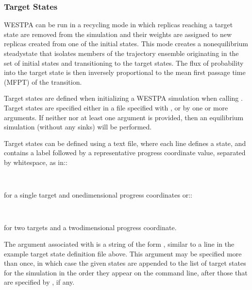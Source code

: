 \documentclass[letterpaper,10pt,english]{sphinxmanual}
\begin{document}
\subsubsection{Target States}
\label{\detokenize{users_guide/west/setup:target-states}}
WESTPA can be run in a recycling mode in which replicas reaching a target state
are removed from the simulation and their weights are assigned to new replicas
created from one of the initial states. This mode creates a non\sphinxhyphen{}equilibrium
steady\sphinxhyphen{}state that isolates members of the trajectory ensemble originating in
the set of initial states and transitioning to the target states. The flux of
probability into the target state is then inversely proportional to the mean
first passage time (MFPT) of the transition.

Target states are defined when initializing a WESTPA simulation when calling
. Target states are specified either in a file specified with
, or by one or more  arguments. If neither
 nor at least one  argument is provided, then an
equilibrium simulation (without any sinks) will be performed.

Target states can be defined using a text file, where each line defines a
state, and contains a label followed by a representative progress coordinate
value, separated by whitespace, as in::

\begin{sphinxVerbatim}[commandchars=\\\{\}]
     
\end{sphinxVerbatim}

for a single target and one\sphinxhyphen{}dimensional progress coordinates or::

\begin{sphinxVerbatim}[commandchars=\\\{\}]
        
        
\end{sphinxVerbatim}

for two targets and a two\sphinxhyphen{}dimensional progress coordinate.

The argument associated with  is a string of the form , similar to a line in the example target state
definition file above. This argument may be specified more than once, in which
case the given states are appended to the list of target states for the
simulation in the order they appear on the command line, after those that are
specified by , if any.
\end{document}
